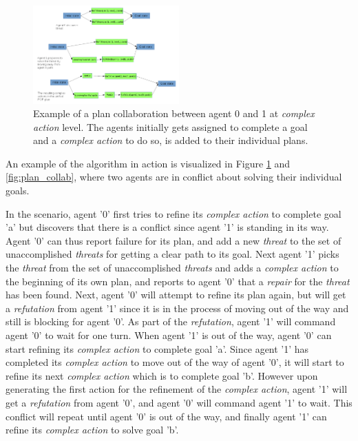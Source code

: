 \documentclass[Main]{subfiles}
\begin{document}
\begin{figure}[h!]
	\centering
	\includegraphics[width=0.5\textwidth]{unhtnpop.png}
	\caption{Example of a plan collaboration between agent 0 and 1 at \textit{complex action} level. The agents initially gets assigned to complete a goal and a \textit{complex action} to do so, is added to their individual plans.}
	\label{fig:htn_collab}
\end{figure}

An example of the algorithm in action is visualized in Figure \ref{fig:htn_collab} and \ref{fig:plan_collab}, where two agents are in conflict about solving their individual goals.

In the scenario, agent '0' first tries to refine its \textit{complex action} to complete goal 'a' but discovers that there is a conflict since agent '1' is standing in its way.
Agent '0' can thus report failure for its plan, and add a new \textit{threat} to the set of unaccomplished \textit{threats} for getting a clear path to its goal.
Next agent '1' picks the \textit{threat} from the set of unaccomplished \textit{threats} and adds a \textit{complex action} to the beginning of its own plan, and reports to agent '0' that a \textit{repair} for the \textit{threat} has been found.
Next, agent '0' will attempt to refine its plan again, but will get a \textit{refutation} from agent '1' since it is in the process of moving out of the way and still is blocking for agent '0'.
As part of the \textit{refutation}, agent '1' will command agent '0' to wait for one turn.
When agent '1' is out of the way, agent '0' can start refining its \textit{complex action} to complete goal 'a'.
Since agent '1' has completed its \textit{complex action} to move out of the way of agent '0', it will start to refine its next \textit{complex action} which is to complete goal 'b'.
However upon generating the first action for the refinement of the \textit{complex action}, agent '1' will get a \textit{refutation} from agent '0', and agent '0' will command agent '1' to wait.
This conflict will repeat until agent '0' is out of the way, and finally agent '1' can refine its \textit{complex action} to solve goal 'b'.




\end{document}
